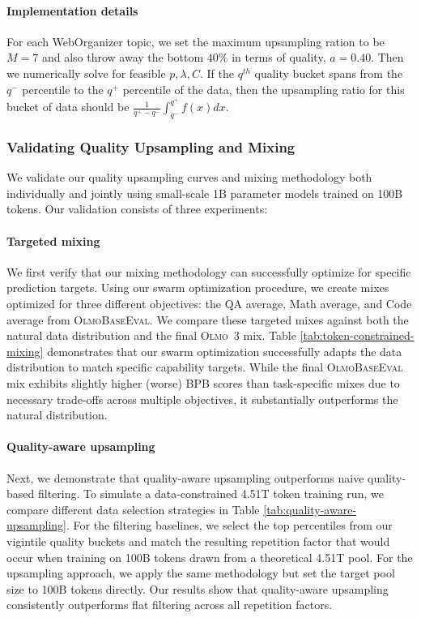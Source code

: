 \documentclass[table]{ai2style/ai2}
\newcommand{\newOlmo}{Olmo\xspace}
\newcommand{\olmothree}{\textsc{\newOlmo~3}\xspace}
\newcommand{\olmothreeeval}{\textsc{OlmoBaseEval}\xspace}
\begin{document}
{{\paragraph{Implementation details} For each WebOrganizer topic, we set the maximum upsampling ration to be $M=7$ and also throw away the bottom $40\%$ in terms of quality, $a=0.40$. Then we numerically solve for feasible $p, \lambda, C$. If the $q^{th}$ quality bucket spans from the $q^-$ percentile to the $q^+$ percentile of the data, then the upsampling ratio for this bucket of data should be $\frac{1}{q^+-q^-} \int_{q^-}^{q^+} f(x)dx$.

\subsubsection{Validating Quality Upsampling and Mixing}

We validate our quality upsampling curves and mixing methodology both individually and jointly using small-scale 1B parameter models trained on 100B tokens. Our validation consists of three experiments:

\paragraph{Targeted mixing} We first verify that our mixing methodology can successfully optimize for specific prediction targets. Using our swarm optimization procedure, we create mixes optimized for three different objectives: the QA average, Math average, and Code average from \olmothreeeval. We compare these targeted mixes against both the natural data distribution and the final \olmothree mix. Table \ref{tab:token-constrained-mixing} demonstrates that our swarm optimization successfully adapts the data distribution to match specific capability targets. While the final \olmothreeeval mix exhibits slightly higher (worse) BPB scores than task-specific mixes due to necessary trade-offs across multiple objectives, it substantially outperforms the natural distribution.

\paragraph{Quality-aware upsampling} Next, we demonstrate that quality-aware upsampling outperforms naive quality-based filtering. To simulate a data-constrained 4.51T token training run, we compare different data selection strategies in Table \ref{tab:quality-aware-upsampling}. For the filtering baselines, we select the top percentiles from our vigintile quality buckets and match the resulting repetition factor that would occur when training on 100B tokens drawn from a theoretical 4.51T pool. For the upsampling approach, we apply the same methodology but set the target pool size to 100B tokens directly. Our results show that quality-aware upsampling consistently outperforms flat filtering across all repetition factors.

}}
\end{document}

